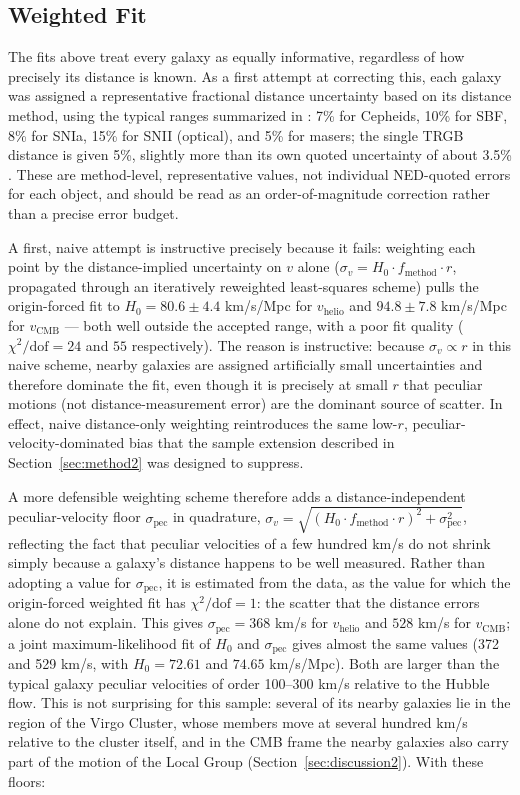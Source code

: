 \documentclass[11pt]{article}
\begin{document}
\subsection{Weighted Fit}
\label{sec:weighted}
The fits above treat every galaxy as equally informative, regardless of how precisely its distance is known. As a first attempt at correcting this, each galaxy was assigned a representative fractional distance uncertainty based on its distance method, using the typical ranges summarized in \citet{freedman2010}: 7\% for Cepheids, 10\% for SBF, 8\% for SNIa, 15\% for SNII (optical), and 5\% for masers; the single TRGB distance is given 5\%, slightly more than its own quoted uncertainty of about 3.5\% \citep{mcquinn2016}. These are method-level, representative values, not individual NED-quoted errors for each object, and should be read as an order-of-magnitude correction rather than a precise error budget.

A first, naive attempt is instructive precisely because it fails: weighting each point by the distance-implied uncertainty on $v$ alone ($\sigma_v = H_0 \cdot f_{\text{method}} \cdot r$, propagated through an iteratively reweighted least-squares scheme) pulls the origin-forced fit to $H_0 = 80.6 \pm 4.4$ km/s/Mpc for $v_{\text{helio}}$ and $94.8 \pm 7.8$ km/s/Mpc for $v_{\text{CMB}}$ --- both well outside the accepted range, with a poor fit quality ($\chi^2/\text{dof} = 24$ and $55$ respectively). The reason is instructive: because $\sigma_v \propto r$ in this naive scheme, nearby galaxies are assigned artificially small uncertainties and therefore dominate the fit, even though it is precisely at small $r$ that peculiar motions (not distance-measurement error) are the dominant source of scatter. In effect, naive distance-only weighting reintroduces the same low-$r$, peculiar-velocity-dominated bias that the sample extension described in Section~\ref{sec:method2} was designed to suppress.

A more defensible weighting scheme therefore adds a distance-independent peculiar-velocity floor $\sigma_{\text{pec}}$ in quadrature, $\sigma_v = \sqrt{(H_0 \cdot f_{\text{method}} \cdot r)^2 + \sigma_{\text{pec}}^2}$, reflecting the fact that peculiar velocities of a few hundred km/s do not shrink simply because a galaxy's distance happens to be well measured. Rather than adopting a value for $\sigma_{\text{pec}}$, it is estimated from the data, as the value for which the origin-forced weighted fit has $\chi^2/\text{dof} = 1$: the scatter that the distance errors alone do not explain. This gives $\sigma_{\text{pec}} = 368$ km/s for $v_{\text{helio}}$ and $528$ km/s for $v_{\text{CMB}}$; a joint maximum-likelihood fit of $H_0$ and $\sigma_{\text{pec}}$ gives almost the same values (372 and 529 km/s, with $H_0 = 72.61$ and $74.65$ km/s/Mpc). Both are larger than the typical galaxy peculiar velocities of order 100--300 km/s relative to the Hubble flow. This is not surprising for this sample: several of its nearby galaxies lie in the region of the Virgo Cluster, whose members move at several hundred km/s relative to the cluster itself, and in the CMB frame the nearby galaxies also carry part of the motion of the Local Group (Section~\ref{sec:discussion2}). With these floors:
\end{document}
